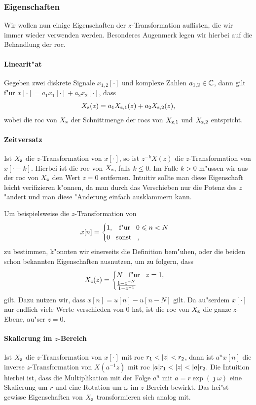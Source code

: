 \subsubsection{Eigenschaften}\label{sec:ztrafo:properties}
%
Wir wollen nun einige Eigenschaften der $z$-Transformation auflisten, die wir immer wieder verwenden werden. 
Besonderes Augenmerk legen wir hierbei auf die Behandlung der \gls{roc}.
%
\paragraph{Linearit"at}
Gegeben zwei diskrete Signale $x_{1,2}[\cdot]$ und komplexe Zahlen $a_{1,2} \in \mathbb{C}$, dann gilt f"ur $x[\cdot] = a_1 x_1[\cdot] + a_2 x_2[\cdot]$, dass
\[
X_{\rm z}(z) = a_1 X_{{\rm z},1}(z) + a_2 X_{{\rm z}, 2}(z),
\]
wobei die \gls{roc} von $X_{{\rm z}}$ der Schnittmenge der \glspl{roc} von $X_{{\rm z},1}$ und $X_{{\rm z},2}$ entspricht.
%
\paragraph{Zeitversatz}
Ist $X_{\rm z}$ die $z$-Transformation von $x[\cdot]$, so ist $z^{-k}X(z)$ die $z$-Transformation von $x[\cdot - k]$.
Hierbei ist die \gls{roc} von $X_{{\rm z}}$, falls $k\leqslant 0$.
Im Falle $k>0$ m"ussen wir aus der \gls{roc} von $X_{{\rm z}}$ den Wert $z=0$ entfernen.
Intuitiv sollte man diese Eigenschaft leicht verifizieren k"onnen, da man durch das Verschieben nur die Potenz des $z$ "andert und man diese "Anderung einfach ausklammern kann.

Um beispielsweise die $z$-Transformation von
\[
x[n] = \begin{cases}
    1, {\hspace{3mm} \text{f"ur} \hspace{3mm}} 0 \leqslant n < N \\
    0 {\hspace{3mm} \text{sonst} \hspace{3mm}}, 
\end{cases}
\]
zu bestimmen, k"onnten wir einerseits die Definition bem"uhen, oder die beiden schon bekannten Eigenschaften ausnutzen, um zu folgern, dass
\[
X_{\rm z}(z) = \begin{cases}
    N {\hspace{3mm} \text{f"ur} \hspace{3mm}} z = 1,\\
    \frac{1 - z^{-N}}{1 - z^{-1}}
\end{cases}
\]
gilt.
Dazu nutzen wir, dass $x[n] = u[n] - u[n-N]$ gilt.
Da au"serdem $x[\cdot]$ nur endlich viele Werte verschieden von $0$ hat, ist die \gls{roc} von $X_{\rm z}$ die ganze $z$-Ebene, au"ser $z=0$.
%
\paragraph{Skalierung im \texorpdfstring{$z$}{z}-Bereich}
Ist $X_{\rm z}$ die $z$-Transformation von $x[\cdot]$ mit \gls{roc} $r_1 < {\left| z \right|} < r_2$, dann ist $a^n x[n]$ die inverse $z$-Transformation von $X(a^{-1} z)$ mit \gls{roc} ${\left| a \right|}r_1 < {\left| z \right|} < {\left| a \right|}r_2$.
Die Intuition hierbei ist, dass die Multiplikation mit der Folge $a^{n}$ mit $a=r\exp(\jmath \omega)$ eine Skalierung um $r$ und eine Rotation um $\omega$ im $z$-Bereich bewirkt.
Das hei"st gewisse  Eigenschaften von $X_{{\rm z}}$ transformieren sich analog mit.
%
